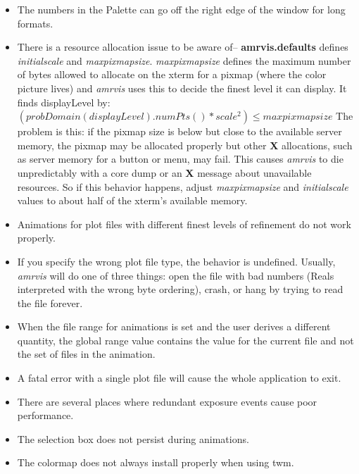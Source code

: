 \documentclass{article}
\begin{document}
\begin{itemize}
\item The numbers in the Palette can go off the right edge of the window
for long formats.

\item There is a resource allocation issue to be aware of--
{\bf amrvis.defaults} defines {\em initialscale} and {\em maxpixmapsize}.
{\em maxpixmapsize} defines the maximum number of bytes allowed to allocate
on the xterm for a pixmap (where the color picture lives) and {\em amrvis}
uses this to decide the finest level it can display.  It finds displayLevel
by:  \( (probDomain(displayLevel).numPts() * {scale^{2}}) \leq maxpixmapsize \)
The problem is this:  if the pixmap size is below but close to the
available server memory, the pixmap may be allocated properly but other
{\bf X} allocations, such as server memory for a button or menu, may fail.
This causes {\em amrvis} to die unpredictably with a core dump or an {\bf X}
message about unavailable resources.  So if this behavior happens, adjust
{\em maxpixmapsize} and {\em initialscale} values to about half
of the xterm's available memory.

\item Animations for plot files with different finest levels of refinement
do not work properly.
  
\item If you specify the wrong plot file type, the behavior is undefined.
Usually, {\em amrvis} will do one of three things:  open the file with
bad numbers (Reals interpreted with the wrong byte ordering), crash, or
hang by trying to read the file forever.
  
\item When the file range for animations is set and the user derives
a different quantity, the global range value contains the value for
the current file and not the set of files in the animation.
  
\item A fatal error with a single plot file will cause the whole application
to exit.
  
\item There are several places where redundant exposure events cause poor
performance.
  
\item The selection box does not persist during animations.

\item The colormap does not always install properly when using twm.


\end{itemize}
\end{document}
